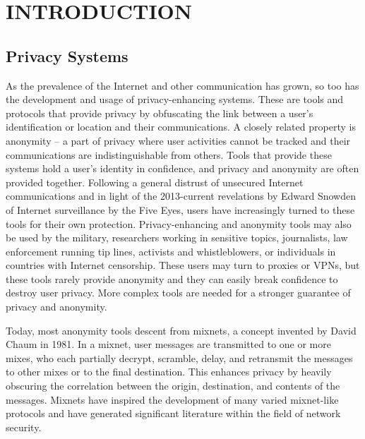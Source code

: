 
\chapter{INTRODUCTION}

\section{Privacy Systems}

% 

As the prevalence of the Internet and other communication has grown, so too has the development and usage of privacy-enhancing systems. These are tools and protocols that provide privacy by obfuscating the link between a user's identification or location and their communications. A closely related property is anonymity -- a part of privacy where user activities cannot be tracked and their communications are indistinguishable from others. Tools that provide these systems hold a user's identity in confidence, and privacy and anonymity are often provided together. Following a general distrust of unsecured Internet communications and in light of the 2013-current revelations by Edward Snowden of Internet surveillance by the Five Eyes, users have increasingly turned to these tools for their own protection. Privacy-enhancing and anonymity tools may also be used by the military, researchers working in sensitive topics, journalists, law enforcement running tip lines, activists and whistleblowers, or individuals in countries with Internet censorship. These users may turn to proxies or VPNs, but these tools rarely provide anonymity and they can easily break confidence to destroy user privacy. More complex tools are needed for a stronger guarantee of privacy and anonymity.

Today, most anonymity tools descent from mixnets, a concept invented by David Chaum in 1981.\cite{chaum2003untraceable} In a mixnet, user messages are transmitted to one or more mixes, who each partially decrypt, scramble, delay, and retransmit the messages to other mixes or to the final destination. This enhances privacy by heavily obscuring the correlation between the origin, destination, and contents of the messages. Mixnets have inspired the development of many varied mixnet-like protocols and have generated significant literature within the field of network security.\cite{edman2009anonymity}\cite{syverson2011peel}

